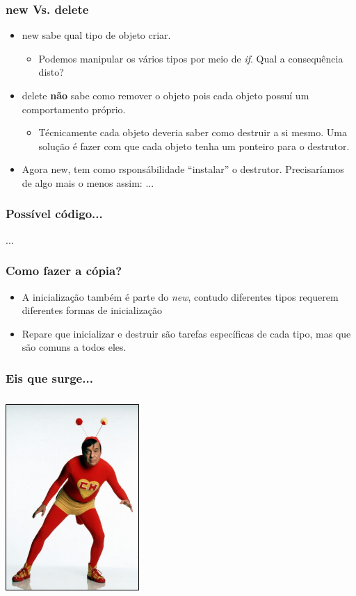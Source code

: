 \documentclass{beamer}
\begin{document}
\begin{frame}
  \frametitle{new Vs. delete}
  \begin{itemize}
   \item<1-> new sabe qual tipo de objeto criar.
    \begin{itemize}
     \item<2-> Podemos manipular os vários tipos por meio de \textit{if}. Qual 
      a consequência disto?
    \end{itemize}
   \item<3-> delete \textbf{não} sabe como remover o objeto pois cada objeto 
    possuí um comportamento próprio.
    \begin{itemize}
     \item<4-> Técnicamente cada objeto deveria saber como destruir a si mesmo. 
      Uma solução é fazer com que cada objeto tenha um ponteiro para o 
      destrutor.
    \end{itemize}
   \item<5-> Agora new, tem como rsponsábilidade ``instalar'' o destrutor. 
    Precisaríamos de algo mais o menos assim: ...

  \end{itemize}

\end{frame}

\begin{frame}
  \frametitle{Possível código...}
  ...
\end{frame}

\begin{frame}
  \frametitle{Como fazer a cópia?}
  \begin{itemize}
   \item<1-> A inicialização também é parte do \textit{new}, contudo diferentes 
    tipos requerem diferentes formas de inicialização
   \item<2-> Repare que inicializar e destruir são tarefas específicas de cada 
    tipo, mas que são comuns a todos eles. 
  \end{itemize}

\end{frame}

\begin{frame}
  \frametitle{Eis que surge...}
  \begin{center}
    \includegraphics[height = 3in, width = 2in]{image/ch.jpg}
  \end{center}
\end{frame}
\end{document}
